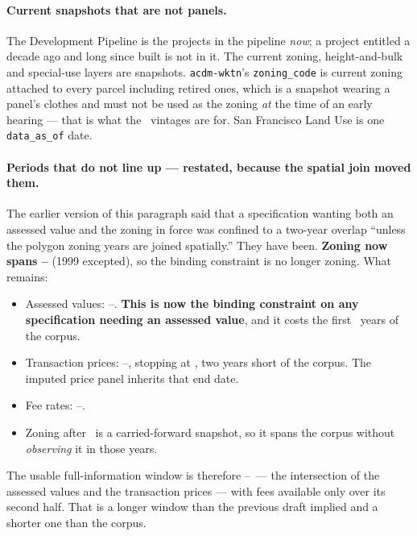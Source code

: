 \documentclass[11pt]{article}
\begin{document}
\paragraph{Current snapshots that are not panels.} The Development Pipeline is the projects in
the pipeline \emph{now}; a project entitled a decade ago and long since built is not in it.
The
current zoning, height-and-bulk and special-use layers are snapshots. \texttt{acdm-wktn}'s
\texttt{zoning\_code} is current zoning attached to every parcel including retired ones, which
is a snapshot wearing a panel's clothes and must not be used as the zoning \emph{at} the time
of an early hearing --- that is what the \acqZoningParcelSpan\ vintages are for. San Francisco Land Use is
one \texttt{data\_as\_of} date.

\paragraph{Periods that do not line up --- restated, because the spatial join moved them.}
The earlier version of this paragraph said that a specification wanting both an assessed value
and the zoning in force was confined to a two-year overlap ``unless the polygon zoning years
are joined spatially.'' They have been. \textbf{Zoning now spans \acqPanelFirst--\acqPanelLast}
(1999 excepted), so the binding constraint is no longer zoning. What remains:

\begin{itemize}
\item Assessed values: \acqAsrFirst--\acqAsrLast. \textbf{This is now the binding constraint on
any specification needing an assessed value}, and it costs the first \acqAsrGapYears\ years of
the corpus.
\item Transaction prices: \acqClDenseFirst--\acqClLast, stopping at \acqClMaxDate, two years
short of the corpus. The imputed price panel inherits that end date.
\item Fee rates: \acqFeeFirst--\acqFeeLast.
\item Zoning after \acqSnapshotFirst\ is a carried-forward snapshot, so it spans the corpus
without \emph{observing} it in those years.
\end{itemize}

The usable full-information window is therefore \acqAsrFirst--\acqClLast\ --- the intersection
of the assessed values and the transaction prices --- with fees available only over its second
half. That is a longer window than the previous draft implied and a shorter one than the
corpus.
\end{document}
